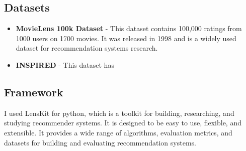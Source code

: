 
\subsection{Datasets}
\begin{itemize}
    \item \textbf{MovieLens 100k Dataset} \cite{10.1145/2827872} - This dataset contains 100,000 ratings from 1000 users on 1700 movies. It was released in 1998 and is a widely used dataset for recommendation systems research.
    \item \textbf{INSPIRED} \cite{hayati-etal-2020-inspired} - 
    This dataset has 
    
\end{itemize}

\subsection{Framework}
I used LensKit for python, \cite{ekstrand_2020_lenskit} which is a toolkit for building, researching, and studying recommender systems. It is designed to be easy to use, flexible, and extensible. It provides a wide range of algorithms, evaluation metrics, and datasets for building and evaluating recommendation systems. 